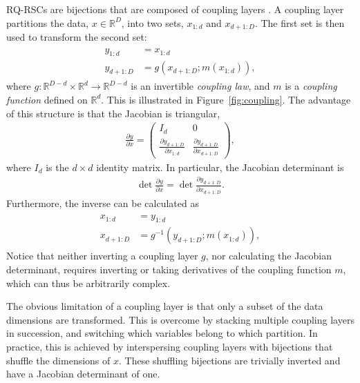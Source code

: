 \documentclass[twocolumn,twocolappendix]{aastex631}
\newcommand{\R}{\mathbb{R}}
\begin{document}
RQ-RSCs are bijections that are composed of coupling layers \citep{dinh2015, dinh2017}.
A coupling layer partitions the data, $x \in \R^D$, into two sets, $x_{1:d}$ and $x_{d+1:D}$.
The first set is then used to transform the second set:
\begin{align}
    \begin{split}
    y^{}_{1:d} &= x^{}_{1:d} \\
    y^{}_{d+1:D} &= g(x^{}_{d+1:D}; m(x^{}_{1:d})),
    \end{split}
\end{align}
where $g : \R^{D-d} \times \R^d \to \R^{D-d}$ is an invertible \emph{coupling law}, and $m$ is a \emph{coupling function} defined on $\R^d$.
This is illustrated in Figure~\ref{fig:coupling}.
The advantage of this structure is that the Jacobian is triangular,
\begin{align}
    \frac{\partial y}{\partial x} =
    \begin{pmatrix}
         I_d & 0 \\
         \frac{\partial y^{}_{d+1:D}}{\partial x^{}_{1:d}}
         & \frac{\partial y^{}_{d+1:D}}{\partial x^{}_{d+1:D}}
    \end{pmatrix},
\end{align}
where $I_d$ is the $d \times d$ identity matrix.
In particular, the Jacobian determinant is
\begin{align}
    \det \frac{\partial y}{\partial x} = \det \frac{\partial y^{}_{d+1:D}}{\partial x^{}_{d+1:D}}.
\end{align}
Furthermore, the inverse can be calculated as
\begin{align}
    \begin{split}
    x^{}_{1:d} &= y^{}_{1:d} \\
    x^{}_{d+1:D} &= g^{-1}(y^{}_{d+1:D}; m(x^{}_{1:d})),
    \end{split}
\end{align}
Notice that neither inverting a coupling layer $g$, nor calculating the Jacobian determinant, requires inverting or taking derivatives of the coupling function $m$, which can thus be arbitrarily complex.

The obvious limitation of a coupling layer is that only a subset of the data dimensions are transformed.
This is overcome by stacking multiple coupling layers in succession, and switching which variables belong to which partition.
In practice, this is achieved by interspersing coupling layers with bijections that shuffle the dimensions of $x$.
These shuffling bijections are trivially inverted and have a Jacobian determinant of one.
\end{document}
